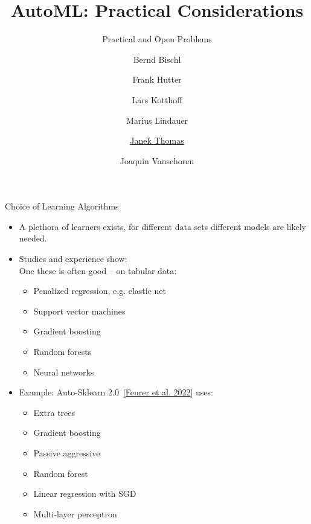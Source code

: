 

\usepackage[normalem]{ulem}
\usepackage{pifont}
\usepackage{relsize}
\renewcommand{\lit}[1]{{\smaller\color{black!60}[#1]}}
\title[AutoML: Practical]{AutoML: Practical Considerations} 
\subtitle{Practical and Open Problems}
\author[Janek Thomas]{Bernd Bischl \and Frank Hutter \and Lars Kotthoff\newline \and Marius Lindauer \and \underline{Janek Thomas} \and Joaquin Vanschoren}



	
	\maketitle

	\begin{frame}{Choice of Learning Algorithms}
		\begin{itemize}
		  \item A plethora of learners exists, for different data sets different models are likely needed.
	  
			  
		  \item Studies and experience show:\\
	  
			  One these is often good -- on tabular data:
		  \begin{itemize}
			\item Penalized regression, e.g. elastic net
			\item Support vector machines
			\item Gradient boosting
			\item Random forests
			\item Neural networks
		\end{itemize}
			\item Example: Auto-Sklearn 2.0~\lit{{\href{https://arxiv.org/pdf/2007.04074.pdf}{Feurer et al. 2022}}} uses: 
	  
		  \begin{itemize}
			  \item Extra trees 
			  \item Gradient boosting 
			  \item Passive aggressive 
			  \item Random forest 
			  \item Linear regression with SGD
			  \item Multi-layer perceptron
		\end{itemize}
		  \end{itemize}
	  \end{frame}
	  
